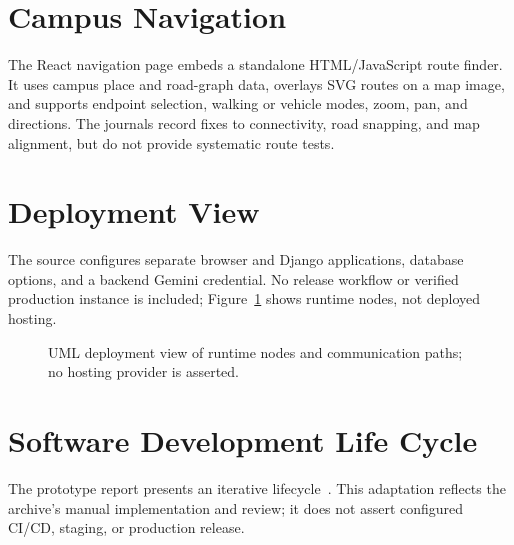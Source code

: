 \documentclass[11pt,a4paper]{report}
\begin{document}
\section{Campus Navigation}
The React navigation page embeds a standalone HTML/JavaScript route finder. It
uses campus place and road-graph data, overlays SVG routes on a map image, and
supports endpoint selection, walking or vehicle modes, zoom, pan, and directions.
The journals record fixes to connectivity, road snapping, and map alignment, but
do not provide systematic route tests.

\section{Deployment View}
The source configures separate browser and Django applications, database
options, and a backend Gemini credential. No release workflow or verified
production instance is included; Figure~\ref{fig:runtime} shows runtime nodes,
not deployed hosting.

\begin{figure}[htbp]
\centering
{}
\caption{UML deployment view of runtime nodes and communication paths; no hosting provider is asserted.}
\label{fig:runtime}
\end{figure}

\section{Software Development Life Cycle}
The prototype report presents an iterative lifecycle~\cite{prototype-report}.
This adaptation reflects the archive's manual implementation and review; it
does not assert configured CI/CD, staging, or production release.
\end{document}
